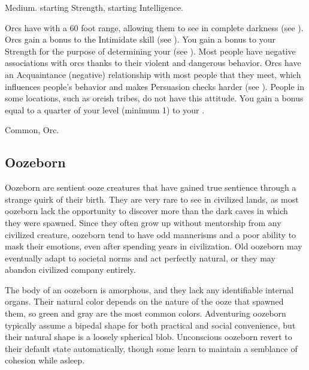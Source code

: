          Medium.
          starting Strength,  starting Intelligence.
        \begin{itemize}
             Orcs have  with a 60 foot range, allowing them to see in complete darkness (see ).
             Orcs gain a  bonus to the Intimidate skill (see ).
             You gain a  bonus to your Strength for the purpose of determining your  (see ).
             Most people have negative associations with orcs thanks to their violent and dangerous behavior.
                Orcs have an Acquaintance (negative) relationship with most people that they meet, which influences people's behavior and makes Persuasion checks harder (see ).
                People in some locations, such as orcish tribes, do not have this attitude.
             You gain a bonus equal to a quarter of your level (minimum 1) to your .
        \end{itemize}
         Common, Orc.

    \subsection{Oozeborn}
        Oozeborn are sentient ooze creatures that have gained true sentience through a strange quirk of their birth.
        They are very rare to see in civilized lands, as most oozeborn lack the opportunity to discover more than the dark caves in which they were spawned.
        Since they often grow up without mentorship from any civilized creature, oozeborn tend to have odd mannerisms and a poor ability to mask their emotions, even after spending years in civilization.
        Old oozeborn may eventually adapt to societal norms and act perfectly natural, or they may abandon civilized company entirely.

        The body of an oozeborn is amorphous, and they lack any identifiable internal organs.
        Their natural color depends on the nature of the ooze that spawned them, so green and gray are the most common colors.
        Adventuring oozeborn typically assume a bipedal shape for both practical and social convenience, but their natural shape is a loosely spherical blob.
        Unconscious oozeborn revert to their default state automatically, though some learn to maintain a semblance of cohesion while asleep.


